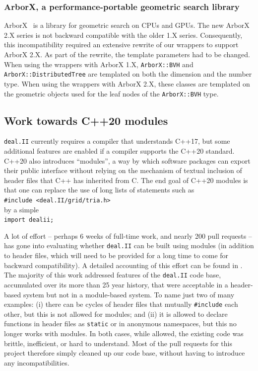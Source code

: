 \documentclass{ansarticle-preprint}
\newcommand{\specialword}[1]{\texttt{#1}}
\newcommand{\dealii}{{\specialword{deal.II}}\xspace}
\begin{document}
\subsubsection{ArborX, a performance-portable geometric search library}
ArborX~\cite{prokopenko2025} is a library for geometric search on CPUs and GPUs.
The new ArborX 2.X series is not backward compatible with the older 1.X series.
Consequently, this incompatibility required an extensive rewrite of our wrappers to
support ArborX 2.X. As part of the rewrite, the template parameters had to
be changed. When using the wrappers with ArborX 1.X, \texttt{ArborX::BVH}
and \texttt{ArborX::DistributedTree} are templated on both the dimension and
the number type. When using the wrappers with ArborX 2.X, these classes are
templated on the geometric objects used for the leaf nodes of the
\texttt{ArborX::BVH} type.


\subsection{Work towards C++20 modules}
\label{subsec:modules}

\dealii{} currently requires a compiler that understands C++17, but
some additional features are enabled if a compiler supports the C++20
standard. C++20 also introduces ``modules'', a way by which software
packages can export their public interface without relying on the
mechanism of textual inclusion of header files that C++ has inherited from C. The
end goal of C++20 modules is that one can replace the use of long
lists of statements such as\\
\hspace*{1cm}\texttt{\#include <deal.II/grid/tria.h>}\\
by a simple\\
\hspace*{1cm}\texttt{import dealii;}

A lot of effort -- perhaps 6 weeks of full-time work, and nearly 200
pull requests -- has gone into evaluating whether \dealii{} can be
built using modules (in addition to header files, which will need to
be provided for a long time to come for backward compatibility). A
detailed accounting of this effort can be found in
\cite{bangerth2025experienceconvertinglargemathematical}. The majority
of this work addressed features of the \dealii{} code base,
accumulated over its more than 25 year history, that were acceptable
in a header-based system but not in a module-based system. To name
just two of many examples: (i) there can be cycles of header files that mutually
\texttt{\#include} each other, but this is not allowed for
modules; and (ii) it is allowed to declare functions in header files
as \texttt{static} or in anonymous namespaces, but this no longer
works with modules. In both cases, while allowed, the existing code
was brittle, inefficient, or hard to understand. Most of the pull requests for this project therefore simply
cleaned up our code base, without having to introduce any
incompatibilities.
\end{document}
